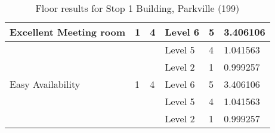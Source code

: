 \begin{table}[H]
{\begin{tabular}{|l|l|l|l|l|l|}
Excellent Meeting room & 1                       & 4                                & Level 6              & 5             & 3.406106        \\ \hline
                      &                         &                                  & Level 5              & 4             & 1.041563        \\ \hline
                      &                         &                                  & Level 2              & 1             & 0.999257        \\ \hline
Easy Availability      & 1                       & 4                                & Level 6              & 5             & 3.406106        \\ \hline
                      &                         &                                  & Level 5              & 4             & 1.041563        \\ \hline
                      &                         &                                  & Level 2              & 1             & 0.999257        \\ \hline
\end{tabular}
}
\caption{Floor results for Stop 1 Building, Parkville (199)}
\label{appendix:stop1_mr_floor}
\end{table}


